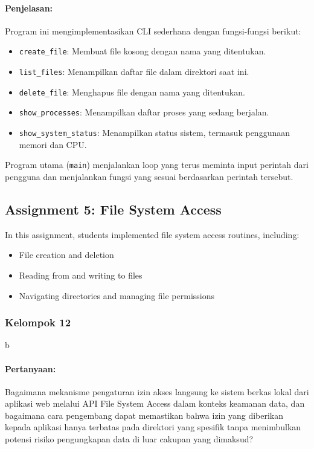 \documentclass[12pt]{article}
\begin{document}
\paragraph{Penjelasan:} Program ini mengimplementasikan CLI sederhana dengan fungsi-fungsi berikut:
\begin{itemize}
    \item \texttt{create\_file}: Membuat file kosong dengan nama yang ditentukan.
    \item \texttt{list\_files}: Menampilkan daftar file dalam direktori saat ini.
    \item \texttt{delete\_file}: Menghapus file dengan nama yang ditentukan.
    \item \texttt{show\_processes}: Menampilkan daftar proses yang sedang berjalan.
    \item \texttt{show\_system\_status}: Menampilkan status sistem, termasuk penggunaan memori dan CPU.
\end{itemize}

Program utama (\texttt{main}) menjalankan loop yang terus meminta input perintah dari pengguna dan menjalankan fungsi yang sesuai berdasarkan perintah tersebut.





\subsection{Assignment 5: File System Access}
In this assignment, students implemented file system access routines, including:
\begin{itemize}
    \item File creation and deletion
    \item Reading from and writing to files
    \item Navigating directories and managing file permissions
\end{itemize}

\subsubsection{Kelompok 12}b

\paragraph{Pertanyaan:} Bagaimana mekanisme pengaturan izin akses langsung ke sistem berkas lokal dari aplikasi web melalui API File System Access dalam konteks keamanan data, dan bagaimana cara pengembang dapat memastikan bahwa izin yang diberikan kepada aplikasi hanya terbatas pada direktori yang spesifik tanpa menimbulkan potensi risiko pengungkapan data di luar cakupan yang dimaksud?
\end{document}
